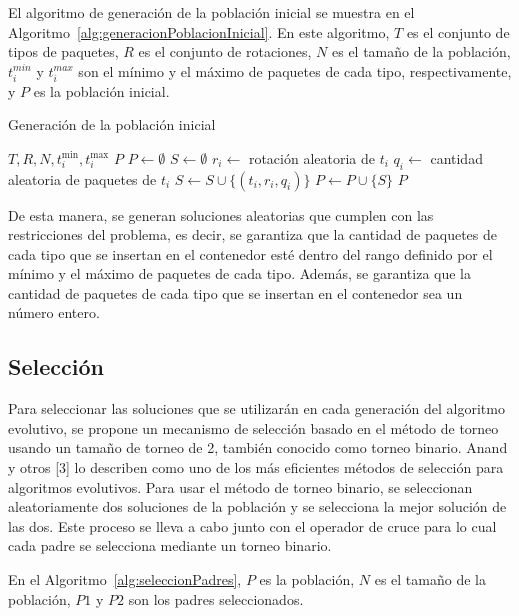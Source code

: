El algoritmo de generación de la población inicial se muestra en el Algoritmo~\ref{alg:generacionPoblacionInicial}. En este algoritmo, $T$ es el conjunto de tipos de paquetes, $R$ es el conjunto de rotaciones, $N$ es el tamaño de la población, $t_i^{min}$ y $t_i^{max}$ son el mínimo y el máximo de paquetes de cada tipo, respectivamente, y $P$ es la población inicial.

\begin{algorithm}[H]
\caption{Generación de la población inicial}\label{alg:generacionPoblacionInicial}
\begin{algorithmic}[1]
\Require $T, R, N, t_i^{\min}, t_i^{\max}$
\Ensure $P$
\State $P \leftarrow \emptyset$
    \State $S \leftarrow \emptyset$
        \State $r_i \leftarrow$ rotación aleatoria de $t_i$
        \State $q_i \leftarrow$ cantidad aleatoria de paquetes de $t_i$
        \State $S \leftarrow S \cup \{(t_i, r_i, q_i)\}$
    \EndFor
    \State $P \leftarrow P \cup \{S\}$
\EndFor
\State \Return $P$
\end{algorithmic}
\end{algorithm}

De esta manera, se generan soluciones aleatorias que cumplen con las restricciones del problema, es decir, se garantiza que la cantidad de paquetes de cada tipo que se insertan en el contenedor esté dentro del rango definido por el mínimo y el máximo de paquetes de cada tipo. Además, se garantiza que la cantidad de paquetes de cada tipo que se insertan en el contenedor sea un número entero.

\subsection{Selección}

Para seleccionar las soluciones que se utilizarán en cada generación del algoritmo evolutivo, se propone un mecanismo de selección basado en el método de torneo usando un tamaño de torneo de 2, también conocido como torneo binario. Anand y otros [3] lo describen como uno de los más eficientes métodos de selección para algoritmos evolutivos. Para usar el método de torneo binario, se seleccionan aleatoriamente dos soluciones de la población y se selecciona la mejor solución de las dos. Este proceso se lleva a cabo junto con el operador de cruce para lo cual cada padre se selecciona mediante un torneo binario.

En el Algoritmo~\ref{alg:seleccionPadres}, $P$ es la población, $N$ es el tamaño de la población, $P1$ y $P2$ son los padres seleccionados.

